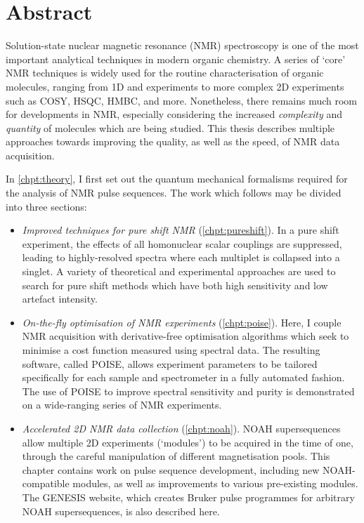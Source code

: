 \chapter{Abstract}

Solution-state nuclear magnetic resonance (NMR) spectroscopy is one of the most important analytical techniques in modern organic chemistry.
A series of `core' NMR techniques is widely used for the routine characterisation of organic molecules, ranging from 1D \proton{} and \carbon{} experiments to more complex 2D experiments such as COSY, HSQC, HMBC, and more.
Nonetheless, there remains much room for developments in NMR, especially considering the increased \textit{complexity} and \textit{quantity} of molecules which are being studied.
This thesis describes multiple approaches towards improving the quality, as well as the speed, of NMR data acquisition.

In \cref{chpt:theory}, I first set out the quantum mechanical formalisms required for the analysis of NMR pulse sequences.
The work which follows may be divided into three sections:

\begin{itemize}
    \item \textit{Improved techniques for pure shift NMR} (\cref{chpt:pureshift}).
        In a pure shift experiment, the effects of all homonuclear scalar couplings are suppressed, leading to highly-resolved spectra where each multiplet is collapsed into a singlet.
        A variety of theoretical and experimental approaches are used to search for pure shift methods which have both high sensitivity and low artefact intensity.
        
    \item \textit{On-the-fly optimisation of NMR experiments} (\cref{chpt:poise}).
        Here, I couple NMR acquisition with derivative-free optimisation algorithms which seek to minimise a cost function measured using spectral data.
        The resulting software, called POISE, allows experiment parameters to be tailored specifically for each sample and spectrometer in a fully automated fashion.
        The use of POISE to improve spectral sensitivity and purity is demonstrated on a wide-ranging series of NMR experiments.

    \item \textit{Accelerated 2D NMR data collection} (\cref{chpt:noah}).
        NOAH supersequences allow multiple 2D experiments (`modules') to be acquired in the time of one, through the careful manipulation of different magnetisation pools.
        This chapter contains work on pulse sequence development, including new NOAH-compatible modules, as well as improvements to various pre-existing modules.
        The GENESIS website, which creates Bruker pulse programmes for arbitrary NOAH supersequences, is also described here.
\end{itemize}
